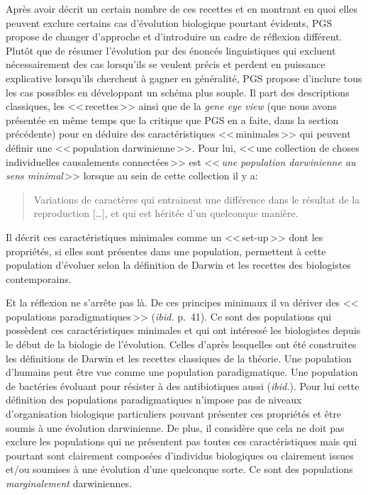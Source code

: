 	Après avoir décrit un certain nombre de ces recettes et en montrant en quoi elles peuvent exclure certains cas d'évolution biologique pourtant évidents, PGS propose de changer d'approche et d'introduire un cadre de réflexion différent. Plutôt que de résumer l'évolution par des énoncés linguistiques qui excluent nécessairement des cas lorsqu'ils se veulent précis et perdent en puissance explicative lorsqu'ils cherchent à gagner en généralité, PGS propose d'inclure tous les cas possibles en développant un schéma plus souple. Il part des descriptions classiques, les <<\,recettes\,>> ainsi que de la \emph{gene eye view} (que nous avons présentée en même temps que la critique que PGS en a faite, dans la section précédente) pour en déduire des caractéristiques <<\,minimales\,>> qui peuvent définir une <<\,population darwinienne\,>>.  Pour lui, <<\,une collection de choses individuelles causalements connectées\,>> est <<\,\emph{une population darwinienne au sens minimal}\,>> lorsque au sein de cette collection il y a:
	\begin{quote}
		Variations de caractères qui entrainent une différence dans le résultat de la reproduction [\ldots], et qui est héritée d'un quelconque manière.
	\end{quote}

	Il décrit ces caractéristiques minimales comme un <<\,set-up\,>> dont les propriétés, si elles sont présentes dans une population, permettent à cette population d'évoluer selon la définition de Darwin et les recettes des biologistes contemporains.
	
	Et la réflexion ne s'arrête pas là. De ces principes minimaux il va dériver des <<\,populations paradigmatiques\,>> (\emph{ibid.} p.~41). Ce sont des populations qui possèdent ces caractéristiques minimales et qui ont intéressé les biologistes depuis le début de la biologie de l'évolution. Celles d'après lesquelles ont été construites les définitions de Darwin et les recettes classiques de la théorie. Une population d'humains peut être vue comme une population paradigmatique. Une population de bactéries évoluant pour résister à des antibiotiques aussi (\emph{ibid.}). Pour lui cette définition des populations paradigmatiques n'impose pas de niveaux d'organisation biologique particuliers pouvant présenter ces propriétés et être soumis à une évolution darwinienne. De plus, il considère que cela ne doit pas exclure les populations qui ne présentent pas toutes ces caractéristiques mais qui pourtant sont clairement composées d'individus biologiques ou clairement issues et/ou soumises à une évolution d'une quelconque sorte. Ce sont des populations \emph{marginalement} darwiniennes.

